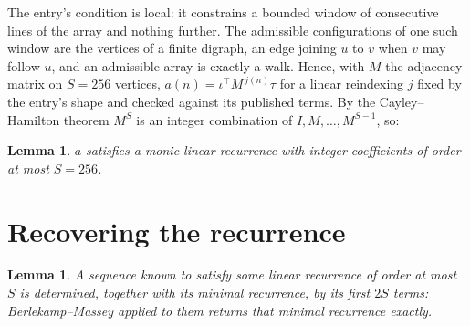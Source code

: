 \documentclass[11pt,a4paper]{article}
\theoremstyle{plain}
\newtheorem{lemma}[theorem]{Lemma}
\theoremstyle{definition}
\begin{document}
The entry's condition is local: it constrains a bounded window of consecutive lines of the
array and nothing further. The admissible configurations of one such window are the vertices
of a finite digraph, an edge joining $u$ to $v$ when $v$ may follow $u$, and an admissible
array is exactly a walk. Hence, with $M$ the adjacency matrix on $S=256$ vertices,
$a(n)=\iota^{\!\top}M^{\,j(n)}\tau$ for a linear reindexing $j$ fixed by the entry's shape
and checked against its published terms. By the Cayley--Hamilton theorem $M^{S}$ is an
integer combination of $I,M,\dots,M^{S-1}$, so:

\begin{lemma}\label{lem:cf}
$a$ satisfies a monic linear recurrence with integer coefficients of order at most $S=256$.
\end{lemma}

\section{Recovering the recurrence}

\begin{lemma}\label{lem:bm}
A sequence known to satisfy some linear recurrence of order at most $S$ is determined, together
with its minimal recurrence, by its first $2S$ terms: Berlekamp--Massey applied to them returns
that minimal recurrence exactly.
\end{lemma}
\end{document}

